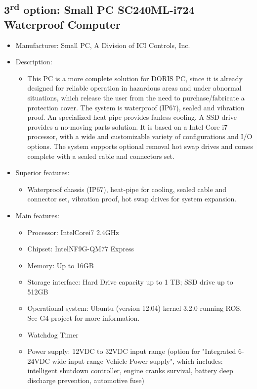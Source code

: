 \subsection{3\textsuperscript{rd} option: Small PC SC240ML-i724 Waterproof Computer}
\begin{itemize}
  \item Manufacturer: Small PC, A Division of ICI Controls, Inc.
  \item Description:
  \begin{itemize}
    \item This PC is a more complete solution for DORIS PC, since it is already designed for reliable operation in hazardous areas and under abnormal situations, which release the user from the need to purchase/fabricate a protection cover. The system is waterproof (IP67), sealed and vibration proof. An specialized heat pipe provides fanless cooling. A SSD drive provides a no-moving parts solution. It is based on a Intel Core i7 processor, with a wide and customizable variety of configurations and I/O options. The system supports optional removal hot swap drives and comes complete with a sealed cable and connectors set.
  \end{itemize}
    \item Superior features:
  \begin{itemize}
    \item Waterproof chassis (IP67), heat-pipe for cooling, sealed cable and connector set, vibration proof, hot swap drives for system expansion.
  \end{itemize}
  \item Main features:
  \begin{itemize}
    \item Processor: Intel\textregistered Core\texttrademark i7 2.4GHz
    \item Chipset: Intel\textregistered NF9G-QM77 Express
    \item Memory: Up to 16GB
    \item Storage interface: Hard Drive capacity up to 1 TB; SSD drive up to 512GB
    \item Operational system: Ubuntu (version 12.04) kernel 3.2.0 running ROS. See G4 project for more information.
    \item Watchdog Timer
    \item Power supply: 12VDC to 32VDC input range (option for "Integrated 6-24VDC wide input range Vehicle Power supply", which includes: intelligent shutdown controller, engine cranks survival, battery deep discharge prevention, automotive fuse)

\end{itemize}
\end{itemize}

